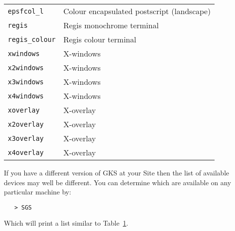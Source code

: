 \begin{latexonly}
\begin{table}
\begin{tabular}{ll}
{\tt epsfcol\_l}       & Colour encapsulated postscript (landscape)\\
{\tt regis}            & Regis monochrome terminal\\
{\tt regis\_colour}    & Regis colour terminal\\
{\tt xwindows}         & X-windows\\
{\tt x2windows}        & X-windows\\
{\tt x3windows}        & X-windows\\
{\tt x4windows}        & X-windows\\
{\tt xoverlay}         & X-overlay\\
{\tt x2overlay}        & X-overlay\\
{\tt x3overlay}        & X-overlay\\
{\tt x4overlay}        & X-overlay\\
\end{tabular}
\label{ta:sgs}
\end{table}

If you have a different version of GKS at your Site then the list of available
devices may well be different.  You can determine which are available on any
particular machine by:

\begin{verbatim}
   > SGS
\end{verbatim}

Which will print a list similar to Table~\ref{ta:sgs}\@.
\end{latexonly}

